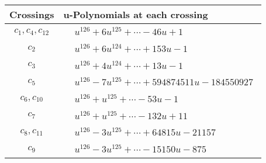 \documentclass[1p]{elsarticle_modified}
\theoremstyle{definition}
\begin{document}
\begin{tabular}{m{50pt}|m{274pt}}
Crossings & \hspace{64pt}u-Polynomials at each crossing \\
\hline $$\begin{aligned}c_{1},c_{4},c_{12}\end{aligned}$$&$\begin{aligned}
&u^{126}+6 u^{125}+\cdots-46 u+1
\end{aligned}$\\
\hline $$\begin{aligned}c_{2}\end{aligned}$$&$\begin{aligned}
&u^{126}+6 u^{124}+\cdots+153 u-1
\end{aligned}$\\
\hline $$\begin{aligned}c_{3}\end{aligned}$$&$\begin{aligned}
&u^{126}+4 u^{124}+\cdots+13 u-1
\end{aligned}$\\
\hline $$\begin{aligned}c_{5}\end{aligned}$$&$\begin{aligned}
&u^{126}-7 u^{125}+\cdots+594874511 u-184550927
\end{aligned}$\\
\hline $$\begin{aligned}c_{6},c_{10}\end{aligned}$$&$\begin{aligned}
&u^{126}+u^{125}+\cdots-53 u-1
\end{aligned}$\\
\hline $$\begin{aligned}c_{7}\end{aligned}$$&$\begin{aligned}
&u^{126}+u^{125}+\cdots-132 u+11
\end{aligned}$\\
\hline $$\begin{aligned}c_{8},c_{11}\end{aligned}$$&$\begin{aligned}
&u^{126}-3 u^{125}+\cdots+64815 u-21157
\end{aligned}$\\
\hline $$\begin{aligned}c_{9}\end{aligned}$$&$\begin{aligned}
&u^{126}-3 u^{125}+\cdots-15150 u-875
\end{aligned}$\\
\hline
\end{tabular}\\~\\
\end{document}
